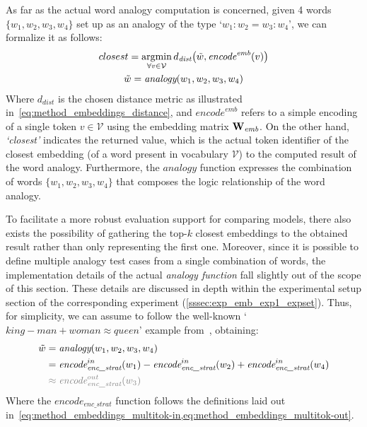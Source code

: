 As far as the actual word analogy computation is concerned, given 4 words $\{w_1, w_2, w_3, w_4\}$ set up as an analogy of the type `$w_1 : w_2 = w_3 : w_4$', we can formalize it as follows:
\begin{equation}
    \label{eq:method_embeddings_analogy}
    \begin{gathered}
        closest = \operatornamewithlimits{argmin}_{\forall v \in \mathcal{V}} d_{\textit{dist}}\bigl(\tilde w, \textit{encode}^{\textit{emb}}(v)\bigr) \\
        \tilde w = \textit{analogy}(w_1, w_2, w_3, w_4)
    \end{gathered}
\end{equation}
Where $d_{\textit{dist}}$ is the chosen distance metric as illustrated in~\cref{eq:method_embeddings_distance}, and $\textit{encode}^{\textit{emb}}$ refers to a simple encoding of a single token $v \in \mathcal{V}$ using the embedding matrix $\bm{\mathbf{W}}_{\textit{emb}}$.
On the other hand, \emph{`closest'} indicates the returned value, which is the actual token identifier of the closest embedding (of a word present in vocabulary $\mathcal{V}$) to the computed result of the word analogy.
Furthermore, the $\textit{analogy}$ function expresses the combination of words $\{w_1, w_2, w_3, w_4\}$ that composes the logic relationship of the word analogy.

To facilitate a more robust evaluation support for comparing models, there also exists the possibility of gathering the top-$k$ closest embeddings to the obtained result rather than only representing the first one.
Moreover, since it is possible to define multiple analogy test cases from a single combination of words, the implementation details of the actual \emph{analogy function} fall slightly out of the scope of this section.
These details are discussed in depth within the experimental setup section of the corresponding experiment (\cref{sssec:exp_emb_exp1_expset}).
Thus, for simplicity, we can assume to follow the well-known `$king - man + woman \approx queen$' example from~\citet{mikolov2013}, obtaining:
\begin{equation}
    \label{eq:method_embeddings_analogy-function}
    \begin{aligned}
        \tilde w &= \textit{analogy}(w_1, w_2, w_3, w_4) \\
        &= {\textit{encode}}_{\textit{enc\_strat}}^{in}(w_1) - {\textit{encode}}_{\textit{enc\_strat}}^{in}(w_2) + {\textit{encode}}_{\textit{enc\_strat}}^{in}(w_4) \\
        &\color{gray} \approx {\textit{encode}}_{\textit{enc\_strat}}^{out}(w_3) 
    \end{aligned}
\end{equation}
Where the ${\textit{encode}}_{\textit{enc\_strat}}$ function follows the definitions laid out in~\cref{eq:method_embeddings_multitok-in,eq:method_embeddings_multitok-out}.

